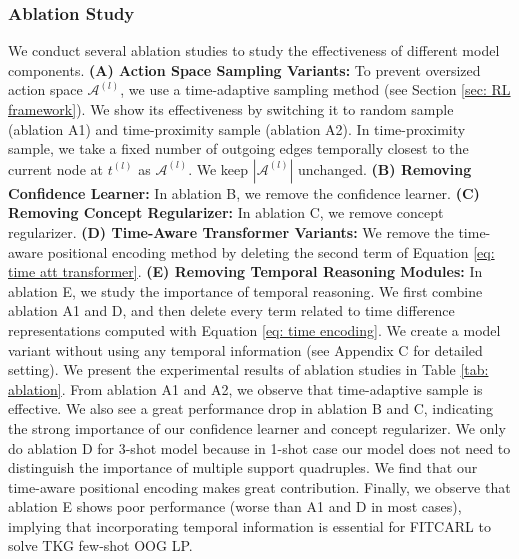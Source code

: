 \documentclass[runningheads]{llncs}
\begin{document}
\subsubsection{Ablation Study}
\label{sec: ablation study}
We conduct several ablation studies to study the effectiveness of different model components. \textbf{(A) Action Space Sampling Variants:} To prevent oversized action space $\mathcal{A}^{(l)}$, we use a time-adaptive sampling method (see Section \ref{sec: RL framework}). We show its effectiveness by switching it to random sample (ablation A1) and time-proximity sample (ablation A2). In time-proximity sample, we take a fixed number of outgoing edges temporally closest to the current node at $t^{(l)}$ as $\mathcal{A}^{(l)}$. We keep $|\mathcal{A}^{(l)}|$ unchanged. 
\textbf{(B) Removing Confidence Learner:} In ablation B, we remove the confidence learner. 
\textbf{(C) Removing Concept Regularizer:} In ablation C, we remove concept regularizer. 
\textbf{(D) Time-Aware Transformer Variants:} 
We remove the time-aware positional encoding method by deleting the second term of Equation \ref{eq: time att transformer}.
\textbf{(E) Removing Temporal Reasoning Modules:} In ablation E, we study the importance of temporal reasoning. 
We first combine ablation A1 and D, and then delete every term related to time difference representations computed with Equation \ref{eq: time encoding}. We create a model variant without using any temporal information (see Appendix C for detailed setting). We present the experimental results of ablation studies in Table \ref{tab: ablation}. From ablation A1 and A2, we observe that time-adaptive sample is effective. 
We also see a great performance drop in ablation B and C, indicating the strong importance of our confidence learner and concept regularizer. We only do ablation D for 3-shot model because in 1-shot case our model does not need to distinguish the importance of multiple support quadruples. We find that our time-aware positional encoding makes great contribution. Finally, we observe that ablation E shows poor performance (worse than A1 and D in most cases), implying that incorporating temporal information is essential for FITCARL to solve TKG few-shot OOG LP.
\end{document}
